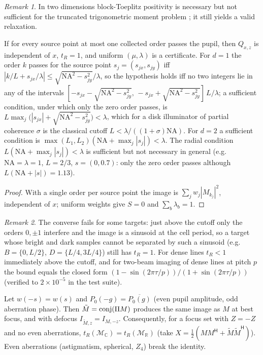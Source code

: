 \documentclass[11pt,a4paper]{article}
\theoremstyle{remark}\newtheorem*{remark}{Remark}
\newcommand{\R}{\mathbb{R}}\newcommand{\C}{\mathbb{C}}\newcommand{\PSD}{\succeq 0}
\newcommand{\I}{I}\newcommand{\rhostar}{\rho^{\star}}\newcommand{\NA}{\mathrm{NA}}\newcommand{\EL}{\mathrm{EL}}
\begin{document}
\begin{remark}
In two dimensions block-Toeplitz positivity is necessary but not sufficient for the truncated trigonometric moment problem \cite{dumitrescu2007}; it still yields a valid relaxation.
\end{remark}
\begin{proposition}[Cutoff]\label{prop:cutoff}
If for every source point at most one collected order passes the pupil, then $Q_{x,z}$ is independent of $x$, $t_R=1$, and uniform $(\mu,\lambda)$ is a certificate. For $d=1$ the order $k$ passes for the source point $s_j=(s_{jx},s_{jy})$ iff $|k/L+s_{jx}/\lambda|\le\sqrt{\NA^2-s_{jy}^2}/\lambda$, so the hypothesis holds iff no two integers lie in any of the intervals $[-s_{jx}-\sqrt{\NA^2-s_{jy}^2},\,-s_{jx}+\sqrt{\NA^2-s_{jy}^2}]\,L/\lambda$; a sufficient condition, under which only the zero order passes, is $L\max_j\big(|s_{jx}|+\sqrt{\NA^2-s_{jy}^2}\big)<\lambda$, which for a disk illuminator of partial coherence $\sigma$ is the classical cutoff $L<\lambda/((1+\sigma)\NA)$. For $d=2$ a sufficient condition is $\max(L_1,L_2)(\NA+\max_j|s_j|)<\lambda$. The radial condition $L(\NA+\max_j|s_j|)<\lambda$ is sufficient but not necessary in general (e.g.\ $\NA=\lambda=1$, $L=2/3$, $s=(0,0.7)$: only the zero order passes although $L(\NA+|s|)=1.13$).
\end{proposition}
\begin{proof}
With a single order per source point the image is $\sum_jw_j|M_{k_j}|^2$, independent of $x$; uniform weights give $S=0$ and $\sum_b\lambda_b=1$.
\end{proof}
\begin{remark}
The converse fails for some targets: just above the cutoff only the orders $0,\pm1$ interfere and the image is a sinusoid at the cell period, so a target whose bright and dark samples cannot be separated by such a sinusoid (e.g.\ $B=\{0,L/2\}$, $D=\{L/4,3L/4\}$) still has $t_R=1$. For dense lines $t_R<1$ immediately above the cutoff, and for two-beam imaging of dense lines at pitch $p$ the bound equals the closed form $(1-\sin(2\pi\tau/p))/(1+\sin(2\pi\tau/p))$ (verified to $2\times10^{-5}$ in the test suite).
\end{remark}
\begin{lemma}\label{lem:complex}
Let $w(-s)=w(s)$ and $P_0(-g)=\overline{P_0(g)}$ (even pupil amplitude, odd aberration phase). Then $\tilde M=\operatorname{conj}(\Pi M)$ produces the same image as $M$ at best focus, and with defocus $\I_{\tilde M,z}=\I_{M,-z}$. Consequently, for a focus set with $Z=-Z$ and no even aberrations, $t_R(\mathcal M_\C)=t_R(\mathcal M_\R)$ (take $X=\tfrac12(MM^{\mathsf H}+\tilde M\tilde M^{\mathsf H})$). Even aberrations (astigmatism, spherical, $Z_4$) break the identity.
\end{lemma}
\end{document}
